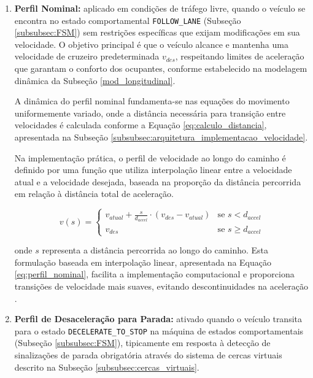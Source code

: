 \begin{enumerate}
    \item \textbf{Perfil Nominal:} aplicado em condições de tráfego livre, quando o veículo se encontra no estado comportamental \texttt{FOLLOW\_LANE} (Subseção \ref{subsubsec:FSM}) sem restrições específicas que exijam modificações em sua velocidade. O objetivo principal é que o veículo alcance e mantenha uma velocidade de cruzeiro predeterminada $v_{des}$, respeitando limites de aceleração que garantam o conforto dos ocupantes, conforme estabelecido na modelagem dinâmica da Subseção \ref{mod_longitudinal}.
    
    A dinâmica do perfil nominal fundamenta-se nas equações do movimento uniformemente variado, onde a distância necessária para transição entre velocidades é calculada conforme a Equação \ref{eq:calculo_distancia}, apresentada na Subseção \ref{subsubsec:arquitetura_implementacao_velocidade}.
    
    Na implementação prática, o perfil de velocidade ao longo do caminho é definido por uma função que utiliza interpolação linear entre a velocidade atual e a velocidade desejada, baseada na proporção da distância percorrida em relação à distância total de aceleração.
    
    \begin{equation}\label{eq:perfil_nominal}
    v(s) = 
    \begin{cases} 
    v_{atual} + \frac{s}{d_{accel}} \cdot (v_{des} - v_{atual}) & \text{se } s < d_{accel} \\
    v_{des} & \text{se } s \geq d_{accel}
    \end{cases}
    \end{equation}
    
    onde $s$ representa a distância percorrida ao longo do caminho. Esta formulação baseada em interpolação linear, apresentada na Equação \ref{eq:perfil_nominal}, facilita a implementação computacional e proporciona transições de velocidade mais suaves, evitando descontinuidades na aceleração \cite{University_of_Toronto2018-mp}.
    
    \item \textbf{Perfil de Desaceleração para Parada:} ativado quando o veículo transita para o estado \texttt{DECELERATE\_TO\_STOP} na máquina de estados comportamentais (Subseção \ref{subsubsec:FSM}), tipicamente em resposta à detecção de sinalizações de parada obrigatória através do sistema de cercas virtuais descrito na Subseção \ref{subsubsec:cercas_virtuais}.
    

\end{enumerate}
